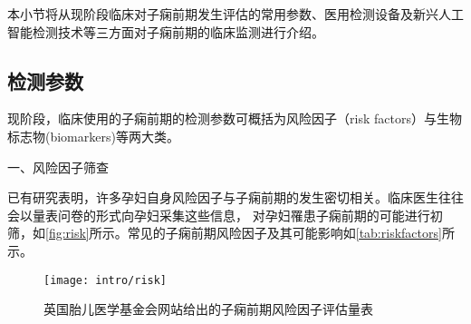 本小节将从现阶段临床对子痫前期发生评估的常用参数、医用检测设备及新兴人工智能检测技术等三方面对子痫前期的临床监测进行介绍。
\subsection{检测参数}
现阶段，临床使用的子痫前期的检测参数可概括为风险因子（risk factors）与生物标志物(biomarkers)等两大类。

一、风险因子筛查

已有研究表明，许多孕妇自身风险因子与子痫前期的发生密切相关\cite{Magee2008,FIGO,Lowe2015,Heazell2010}。临床医生往往会以量表问卷的形式向孕妇采集这些信息，
对孕妇罹患子痫前期的可能进行初筛\cite{risks}，如\autoref{fig:risk}所示。常见的子痫前期风险因子及其可能影响如\autoref{tab:riskfactors}所示。
\begin{figure}[htbp]
    \centering
    \texttt{[image: intro/risk]}
    \caption[英国胎儿医学基金会网站给出的子痫前期风险因子评估量表]{\label{fig:risk}英国胎儿医学基金会网站给出的子痫前期风险因子评估量表\cite{risks}}
\end{figure}

